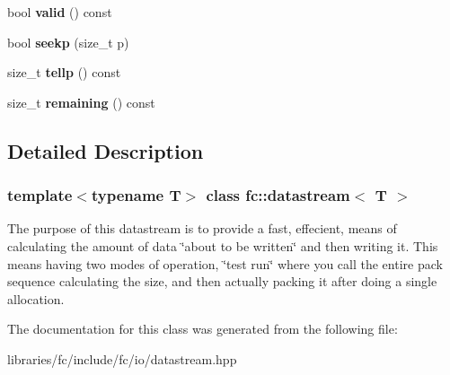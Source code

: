 \begin{DoxyCompactItemize}
\item 
\mbox{\label{classfc_1_1datastream_a4ff633c9925fc602b8b0e8a12e2bc01d}} 
bool {\bfseries valid} () const
\item 
\mbox{\label{classfc_1_1datastream_a92e1204cc012776ccbfc8e2078d779dc}} 
bool {\bfseries seekp} (size\+\_\+t p)
\item 
\mbox{\label{classfc_1_1datastream_a6cb60b9fd34f563116d4759b9a87d1eb}} 
size\+\_\+t {\bfseries tellp} () const
\item 
\mbox{\label{classfc_1_1datastream_a15c5c832bd5682adc17f3d1f355b0dcf}} 
size\+\_\+t {\bfseries remaining} () const
\end{DoxyCompactItemize}


\subsection{Detailed Description}
\subsubsection*{template$<$typename T$>$\newline
class fc\+::datastream$<$ T $>$}

The purpose of this datastream is to provide a fast, effecient, means of calculating the amount of data \char`\"{}about to be written\char`\"{} and then writing it. This means having two modes of operation, \char`\"{}test run\char`\"{} where you call the entire pack sequence calculating the size, and then actually packing it after doing a single allocation. 

The documentation for this class was generated from the following file\+:\begin{DoxyCompactItemize}
\item 
libraries/fc/include/fc/io/datastream.\+hpp\end{DoxyCompactItemize}
